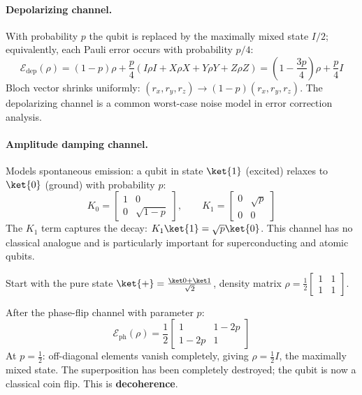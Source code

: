 \documentclass[oneside]{academica}
\begin{document}
\paragraph{Depolarizing channel.}
With probability $p$ the qubit is replaced by the maximally mixed state $I/2$; equivalently, each Pauli error occurs with probability
$p/4$:
\begin{equation*}
  \mathcal{E}_{\mathrm{dep}}(\rho)=\left(1-p\right)\rho+\frac{p}{4}(I\rho I+X\rho X+Y\rho Y+Z\rho Z)
  =\left(1-\frac{3p}{4}\right)\rho+\frac{p}{4}I
\end{equation*}
Bloch vector shrinks uniformly: $(r_x,r_y,r_z)\to(1-p)(r_x,r_y,r_z)$.
The depolarizing channel is a common worst-case noise model in error correction analysis.

\paragraph{Amplitude damping channel.}
Models spontaneous emission: a qubit in state $\ket{1}$ (excited)
relaxes to $\ket{0}$ (ground) with probability $p$:
\begin{equation*}
  K_0=\begin{bmatrix}1&0\\0&\sqrt{1-p}\end{bmatrix},\qquad
  K_1=\begin{bmatrix}0&\sqrt{p}\\0&0\end{bmatrix}
\end{equation*}
The $K_1$ term captures the decay: $K_1\ket{1}=\sqrt{p}\ket{0}$.
This channel has no classical analogue and is particularly important for superconducting and atomic qubits.

\begin{example*}
  Start with the pure state $\ket{+}=\frac{\ket0+\ket1}{\sqrt2}$, density matrix $\rho=\frac12\begin{bmatrix}1&1\\1&1\end{bmatrix}$.
  
  After the phase-flip channel with parameter $p$:
  \begin{equation*}
    \mathcal{E}_{\mathrm{ph}}(\rho)= \frac12\begin{bmatrix}1&1-2p\\1-2p&1\end{bmatrix}
  \end{equation*}
  At $p=\frac12$: off-diagonal elements vanish completely, giving $\rho=\frac12 I$, the maximally mixed state.
  The superposition has been completely destroyed; the qubit is now a classical coin flip.
  This is \textbf{decoherence}.
\end{example*}
\end{document}
